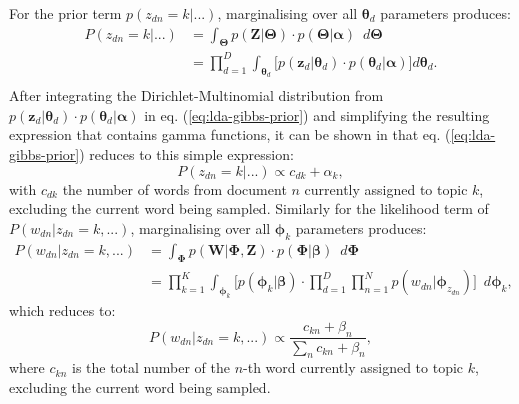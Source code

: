 For the prior term $p({z}_{dn}=k \vert ...)$, marginalising over all $\boldsymbol{\theta}_{d}$ parameters produces:
\begin{equation}
\begin{aligned}
P({z}_{dn}=k \vert ...) &= \int_{\boldsymbol{\Theta}}  p(\boldsymbol{Z} \vert \boldsymbol{\Theta}) \cdot p(\boldsymbol{\Theta} \vert \boldsymbol{\alpha}) \enspace d\boldsymbol{\Theta} \\
                                  &= \prod_{d=1}^{D} \int_{\boldsymbol{\theta}_d} \Bigg[ p(\boldsymbol{z}_{d} \vert \boldsymbol{\theta}_d) \cdot p(\boldsymbol{\theta}_d \vert \boldsymbol{\alpha}) \Bigg] d\boldsymbol{\theta}_d. \\
\end{aligned}                                  
\label{eq:lda-gibbs-prior}
\end{equation}
After integrating the Dirichlet-Multinomial distribution from $p(\boldsymbol{z}_{d} \vert \boldsymbol{\theta}_d) \cdot p(\boldsymbol{\theta}_d \vert \boldsymbol{\alpha})$ in eq. (\ref{eq:lda-gibbs-prior}) and simplifying the resulting expression that contains gamma functions, it can be shown in \cite{carpenter2010integrating} that eq. (\ref{eq:lda-gibbs-prior}) reduces to this simple expression:
\begin{equation}
P({z}_{dn}=k \vert ...) \propto  c_{dk} + {\alpha}_k,
\label{eq:lda-gibbs-prior-simple}
\end{equation}
with $c_{dk}$ the number of words from document $n$ currently assigned to topic $k$, excluding the current word being sampled. Similarly for the likelihood term of $P({w}_{dn} \vert {z}_{dn}=k, ...)$, marginalising over all $\boldsymbol{\phi}_k$ parameters produces:
\begin{equation}
\begin{aligned}
P({w}_{dn} \vert {z}_{dn}=k, ...) &= \int_{\boldsymbol{\Phi}} p(\boldsymbol{W} \vert \boldsymbol{\Phi}, \boldsymbol{Z}) \cdot p(\boldsymbol{\Phi} \vert \boldsymbol{\beta}) \enspace d\boldsymbol{\Phi} \\
                                                 &= \prod_{k=1}^{K} \int_{\boldsymbol{\phi}_k} \Bigg[ p(\boldsymbol{\phi}_k \vert \boldsymbol{\beta}) \cdot \prod_{d=1}^{D} \prod_{n=1}^{N} p(w_{dn} \vert \boldsymbol{\phi}_{z_{dn}}) \Bigg]\enspace d\boldsymbol{\phi}_k,
\end{aligned}
\label{eq:lda-gibbs-likelihood}
\end{equation}
which reduces to:
\begin{equation}
P({w}_{dn} \vert {z}_{dn}=k, ...) \propto \frac{c_{kn} + {\beta}_n}{\sum_{n} c_{kn} + {\beta}_n},
\label{eq:lda-gibbs-likelihood-simple}
\end{equation}
where $c_{kn}$ is the total number of the $n$-th word currently assigned to topic $k$, excluding the current word being sampled.  

